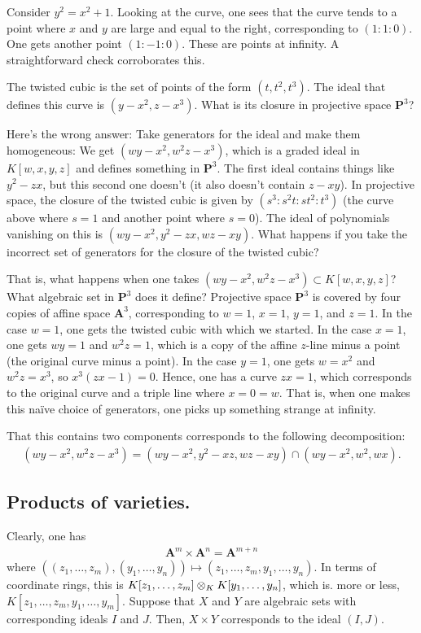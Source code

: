 \documentclass [11 pt, oneside] {article}
\begin{document}
\begin{example}[ ]\label{}
Consider $y^2 = x^2 + 1$. Looking at the curve, one sees that the curve tends to a point where $x$ and $y$ are large and equal to the right, corresponding to $(1:1:0)$. One gets another point $(1:-1:0)$. These are points at infinity. A straightforward check corroborates this.
\end{example}

\begin{example}\label{}
The twisted cubic is the set of points of the form $(t,t^2,t^3)$. The ideal that defines this curve is $(y-x^2, z-x^3)$. What is its closure in projective space $\mathbf{P}^3$?

Here's the wrong answer: Take generators for the ideal and make them homogeneous: We get $ (wy-x^2,w^2z-x^3)$, which is a graded ideal in $K[w,x,y,z]$ and defines something in $\mathbf{P}^3$. The first ideal contains things like $y^2-zx$, but this second one doesn't (it also doesn't contain $z-xy$). In projective space, the closure of the twisted cubic is given by $(s^3:s^2t:st^2:t^3)$ (the curve above where $s=1$ and another point where $s=0$). The ideal of polynomials vanishing on this is $(wy-x^2, y^2-zx, wz- xy)$. What happens if you take the incorrect set of generators for the closure of the twisted cubic?

That is, what happens when one takes $(wy-x^2, w^2z - x^3) \subset K[w,x,y,z]$? What algebraic set in $\mathbf{P}^3$ does it define? Projective space $\mathbf{P}^3$ is covered by four copies of affine space $\mathbf{A}^3$, corresponding to $w=1$, $x=1$, $y=1$, and $z=1$. In the case $w=1$, one gets the twisted cubic with which we started. In the case $x=1$, one gets $wy=1$ and $w^2z = 1$, which is a copy of the affine $z$-line minus a point (the original curve minus a point). In the case $y=1$, one gets $w=x^2$ and $w^2z=x^3$, so $x^3(zx-1)=0$. Hence, one has a curve $zx=1$, which corresponds to the original curve and a triple line where $x=0=w$. That is, when one makes this na\"ive choice of generators, one picks up something strange at infinity.

That this contains two components corresponds to the following decomposition:
\begin{align*}
	(wy-x^2, w^2z - x^3) = (wy-x^2,y^2-xz, wz-xy) \cap  (wy-x^2, w^2, wx).
\end{align*}
\end{example}

\subsection{Products of varieties.}
Clearly, one has
\begin{align*}
	\mathbf{A}^m \times \mathbf{A}^n = \mathbf{A}^{m+n}
\end{align*}
where $((z_1,\hdots,z_m),(y_1,\hdots,y_n))\longmapsto  (z_1,\hdots, z_m,y_1,\hdots, y_n)$. In terms of coordinate rings, this is $K[z_1,\hdots,z_m]\otimes_K K[y_1,\hdots, y_n]$, which is. more or less, $K[z_1,\hdots, z_m,y_1,\hdots, y_m]$. Suppose that $X$ and $Y$ are algebraic sets with corresponding ideals $I$ and $J$. Then, $X\times Y$ corresponds to the ideal $(I,J)$.
\end{document}

